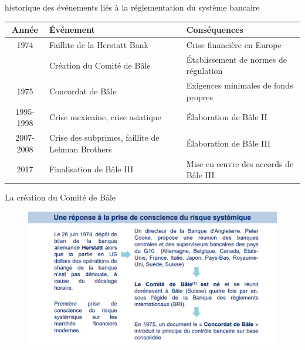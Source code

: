 

\begin{frame}{historique des événements liés à la réglementation du système bancaire}
\begin{table}[htbp]
    \centering
    \begin{tabular}{|c|p{4cm}|p{4cm}|}
        \hline
        \textbf{Année} & \textbf{Événement} & \textbf{Conséquences} \\
        \hline
        1974 & Faillite de la Herstatt Bank & Crise financière en Europe \\
             & Création du Comité de Bâle & Établissement de normes de régulation \\
        \hline
        1975 & Concordat de Bâle & Exigences minimales de fonds propres \\
        \hline
        1995-1998 & Crise mexicaine, crise asiatique & Élaboration de Bâle II \\
        \hline
        2007-2008 & Crise des subprimes, faillite de Lehman Brothers & Élaboration de Bâle III \\
        \hline
        2017 & Finalisation de Bâle III & Mise en œuvre des accords de Bâle III \\
        \hline
    \end{tabular}
\end{table}
\end{frame}

\begin{frame}{La création du Comité de Bâle}
    \begin{figure}[h]
        \centering
        \includegraphics[scale=0.45]{Frames/Les Accords de Bale/p2.png}
    \end{figure}
\end{frame}


